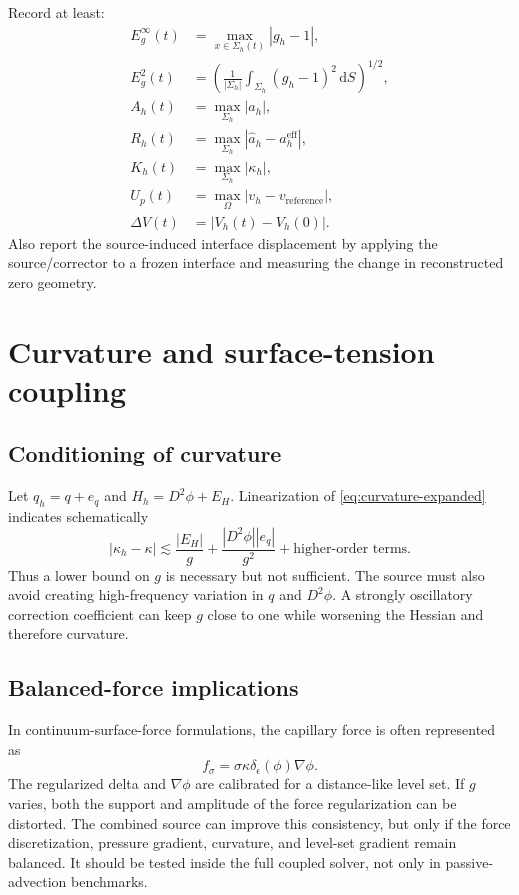 \documentclass[11pt,a4paper]{article}
\theoremstyle{definition}
\theoremstyle{remark}
\newcommand{\abs}[1]{\left\lvert #1\right\rvert}
\begin{document}
Record at least:
\begin{align}
  E_g^{\infty}(t)&=\max_{x\in\Sigma_h(t)}\abs{g_h-1},\\
  E_g^{2}(t)&=\left(\frac1{|\Sigma_h|}\int_{\Sigma_h}(g_h-1)^2\,\mathrm dS\right)^{1/2},\\
  A_h(t)&=\max_{\Sigma_h}\abs{a_h},\\
  R_h(t)&=\max_{\Sigma_h}\abs{\widehat a_h-a_h^{\mathrm{eff}}},\\
  K_h(t)&=\max_{\Sigma_h}\abs{\kappa_h},\\
  U_p(t)&=\max_{\Omega}\abs{v_h-v_{\mathrm{reference}}},\\
  \Delta V(t)&=\abs{V_h(t)-V_h(0)}.
\end{align}
Also report the source-induced interface displacement by applying the source/corrector to a frozen interface and measuring the change in reconstructed zero geometry.

\section{Curvature and surface-tension coupling}

\subsection{Conditioning of curvature}

Let $q_h=q+e_q$ and $H_h=D^2\phi+E_H$. Linearization of \eqref{eq:curvature-expanded} indicates schematically
\begin{equation}
  \abs{\kappa_h-\kappa}
  \lesssim
  \frac{\abs{E_H}}{g}
  +\frac{\abs{D^2\phi}\abs{e_q}}{g^2}
  +\text{higher-order terms}.
  \label{eq:curvature-error-schematic}
\end{equation}
Thus a lower bound on $g$ is necessary but not sufficient. The source must also avoid creating high-frequency variation in $q$ and $D^2\phi$. A strongly oscillatory correction coefficient can keep $g$ close to one while worsening the Hessian and therefore curvature.

\subsection{Balanced-force implications}

In continuum-surface-force formulations, the capillary force is often represented as
\begin{equation}
  f_\sigma=\sigma\kappa\delta_\epsilon(\phi)\nabla\phi.
\end{equation}
The regularized delta and $\nabla\phi$ are calibrated for a distance-like level set. If $g$ varies, both the support and amplitude of the force regularization can be distorted. The combined source can improve this consistency, but only if the force discretization, pressure gradient, curvature, and level-set gradient remain balanced. It should be tested inside the full coupled solver, not only in passive-advection benchmarks.
\end{document}
